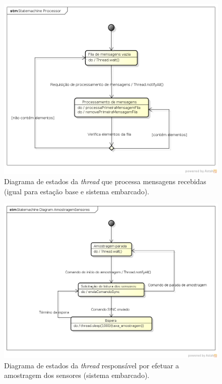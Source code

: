 \begin{figure}[H]
  \centering
  \includegraphics[width=\textwidth, keepaspectratio]{./figuras/diagrama_estados_processor.png}
  \caption{Diagrama de estados da \textit{thread} que processa mensagens recebidas (igual para estação base e sistema embarcado).}
  \label{fig:diagrama_estados_processor}
\end{figure}

\begin{figure}[H]
  \centering
  \includegraphics[width=\textwidth, keepaspectratio]{./figuras/diagrama_estados_amostragem_sensores.png}
  \caption{Diagrama de estados da \textit{thread} responsável por efetuar a amostragem dos sensores (sistema embarcado).}
  \label{fig:diagrama_estados_amostragem_sensores}
\end{figure}



